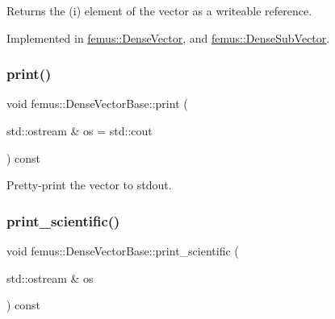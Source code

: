 \begin{DoxyItemize}
\item \begin{DoxyReturn}{Returns}
the {\ttfamily }(i) element of the vector as a writeable reference. 
\end{DoxyReturn}

\end{DoxyItemize}

Implemented in \mbox{\hyperlink{classfemus_1_1_dense_vector_abee121241acbc2d29a7e54fc27588357}{femus\+::\+Dense\+Vector}}, and \mbox{\hyperlink{classfemus_1_1_dense_sub_vector_a5cb51e53b54d085933d2ebe6f762ecd1}{femus\+::\+Dense\+Sub\+Vector}}.

\mbox{\label{classfemus_1_1_dense_vector_base_a19f3668a4fbc40cc79d954030ed521df}} 
\subsubsection{\texorpdfstring{print()}{print()}}
{\footnotesize\ttfamily void femus\+::\+Dense\+Vector\+Base\+::print (\begin{DoxyParamCaption}\item[{std\+::ostream \&}]{os = {\ttfamily std\+:\+:cout} }\end{DoxyParamCaption}) const}



Pretty-\/print the vector to {\ttfamily stdout}. 

\mbox{\label{classfemus_1_1_dense_vector_base_a9397ba2e7af03c1f509dbdc1a30a67ff}} 
\subsubsection{\texorpdfstring{print\+\_\+scientific()}{print\_scientific()}}
{\footnotesize\ttfamily void femus\+::\+Dense\+Vector\+Base\+::print\+\_\+scientific (\begin{DoxyParamCaption}\item[{std\+::ostream \&}]{os }\end{DoxyParamCaption}) const}



